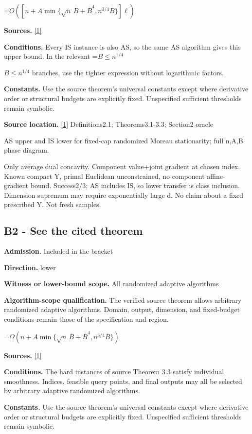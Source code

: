 \documentclass[10pt,a4paper]{article}
\newcommand{\AtlasMath}[1]{\par\begingroup\centering\setbox0=\hbox{$\displaystyle #1$}\ifdim\wd0>1.4\linewidth\typeout{ATLAS WIDE FORMULA: \the\wd0}\fi\ifdim\wd0>\linewidth\resizebox{\linewidth}{!}{\box0}\else\box0\fi\par\endgroup}
\newcommand{\AtlasInlineMath}[1]{\begingroup\setbox0=\hbox{$#1$}\ifdim\wd0>.4\linewidth\endgroup\AtlasMath{#1}\else\endgroup$#1$\fi}
\begin{document}
\AtlasMath{O\!\left([n+A\min\{\sqrt n\,\overline B+\overline B^4,n^{3/4}\overline B\}]\ell\right)}
\textbf{Sources.} \href{https://arxiv.org/pdf/2610.16991v2}{[1]}

\textbf{Conditions.} Every IS instance is also AS, so the same AS algorithm gives this upper bound. In the relevant \AtlasInlineMath{B\le n^{1/4}} branches, use the tighter expression without logarithmic factors.

\textbf{Constants.} Use the source theorem’s universal constants except where derivative order or structural budgets are explicitly fixed. Unspecified sufficient thresholds remain symbolic.

\textbf{Source location.} \href{https://arxiv.org/pdf/2610.16991v2}{[1]} Definitions2.1; Theorems3.1-3.3; Section2 oracle

AS upper and IS lower for fixed-cap randomized Moreau stationarity; full n,A,B phase diagram.

Only average dual concavity. Component value+joint gradient at chosen index. Known compact Y, primal Euclidean unconstrained, no component affine-gradient bound. Success2/3; AS includes IS, so lower transfer is class inclusion. Dimension supremum may require exponentially large d. No claim about a fixed prescribed Y. Not fresh samples.

\subsection{B2 - See the cited theorem}
\textbf{Admission.} Included in the bracket

\textbf{Direction.} lower

\textbf{Witness or lower-bound scope.} All randomized adaptive algorithms

\textbf{Algorithm-scope qualification.} The verified source theorem allows arbitrary randomized adaptive algorithms. Domain, output, dimension, and fixed-budget conditions remain those of the specification and region.

\AtlasMath{\Omega\!\left(n+A\min\{\sqrt n\,\overline B+\overline B^4,n^{3/4}\overline B\}\right)}
\textbf{Sources.} \href{https://arxiv.org/pdf/2610.16991v2}{[1]}

\textbf{Conditions.} The hard instances of source Theorem 3.3 satisfy individual smoothness. Indices, feasible query points, and final outputs may all be selected by arbitrary adaptive randomized algorithms.

\textbf{Constants.} Use the source theorem’s universal constants except where derivative order or structural budgets are explicitly fixed. Unspecified sufficient thresholds remain symbolic.
\end{document}
